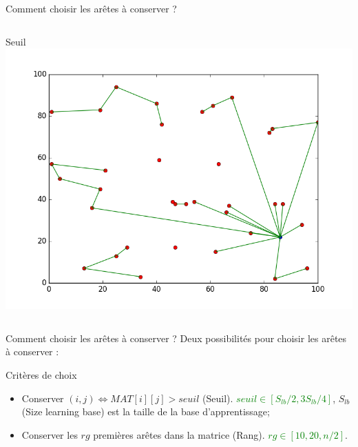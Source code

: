 \documentclass{beamer}
\begin{document}
\begin{frame}{Comment choisir les arêtes à conserver ?}
\begin{columns}[t]
 
  \begin{column}{4cm}
  	\centering
  	Seuil
	\includegraphics[scale=0.2]{edges_seuil.png}
	
  \end{column}
\end{columns}  
\end{frame}

\begin{frame}{Comment choisir les arêtes à conserver ?}
Deux possibilités pour choisir les arêtes à conserver :
\begin{block}{Critères de choix}
\begin{itemize}
\item Conserver $(i,j) \Leftrightarrow MAT[i][j] > seuil$ (Seuil). \textcolor{green}{$seuil \in [S_{lb}/2,3S_{lb}/4]$}, $S_{lb}$ (Size learning base) est la taille de la base d'apprentissage;
\item Conserver les $rg$ premières arêtes dans la matrice (Rang). \textcolor{green}{$rg \in [10,20,n/2]$}.
\end{itemize}
\end{block}
\end{frame}
\end{document}
